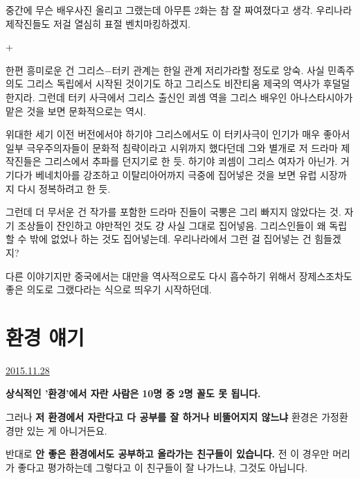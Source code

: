 중간에 무슨 배우사진 올리고 그랬는데 아무튼 2화는 참 잘 짜여졌다고 생각.
우리나라 제작진들도 저걸 열심히 표절 벤치마킹하겠지.
\vspace{5mm}

+
\vspace{5mm}

한편 흥미로운 건 그리스$-$터키 관계는 한일 관계 저리가라할 정도로 앙숙.
사실 민족주의도 그리스 독립에서 시작된 것이기도 하고 그리스도 비잔티움 제국의 역사가 후덜덜한지라.
그런데 터키 사극에서 그리스 출신인 쾨셈 역을 그리스 배우인 아나스타시아가 맡은 것을 보면 문화적으로는 역시.
\vspace{5mm}

위대한 세기 이전 버전에서야 하기야 그리스에서도 이 터키사극이 인기가 매우 좋아서 일부 극우주의자들이 문화적 침략이라고 시위까지 했다던데
그와 별개로 저 드라마 제작진들은 그리스에서 추파를 던지기로 한 듯. 하기야 쾨셈이 그리스 여자가 아닌가.
거기다가 베네치아를 강조하고 이탈리아어까지 극중에 집어넣은 것을 보면 유럽 시장까지 다시 정복하려고 한 듯.
\vspace{5mm}

그런데 더 무서운 건 작가를 포함한 드라마 진들이 국뽕은 그리 빠지지 않았다는 것.
자기 조상들이 잔인하고 야만적인 것도 걍 사실 그대로 집어넣음. 그리스인들이 왜 독립할 수 밖에 없었나 하는 것도 집어넣는데.
우리나라에서 그런 걸 집어넣는 건 힘들겠지?
\vspace{5mm}

다른 이야기지만 중국에서는 대만을 역사적으로도 다시 흡수하기 위해서
장제스조차도 좋은 의도로 그랬다라는 식으로 띄우기 시작하던데.
\vspace{5mm}




\section{환경 얘기}
\href{https://www.kockoc.com/Apoc/514971}{2015.11.28}

\vspace{5mm}

\textbf{상식적인 '환경'에서 자란 사람은}
\textbf{10명 중 2명 꼴도 못 됩니다.}
\vspace{5mm}

그러나 \textbf{저 환경에서 자란다고 다 공부를 잘 하거나 비뚤어지지 않느냐}
환경은 가정환경만 있는 게 아니거든요.
\vspace{5mm}

반대로 \textbf{안 좋은 환경에서도 공부하고 올라가는 친구들이 있습니다.}
전 이 경우만 머리가 좋다고 평가하는데 그렇다고 이 친구들이 잘 나가느냐, 그것도 아닙니다.
\vspace{5mm}

